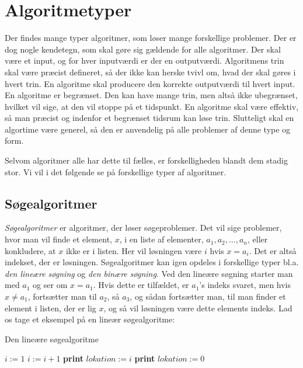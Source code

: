 \section{Algoritmetyper}
Der findes mange typer algoritmer, som løser mange forskellige problemer. Der er dog nogle kendetegn, som skal gøre sig gældende for alle algoritmer. Der skal være et input, og for hver inputværdi er der en outputværdi. Algoritmens trin skal være præcist defineret, så der ikke kan herske tvivl om, hvad der skal gøres i hvert trin. En algoritme skal producere den korrekte outputværdi til hvert input. En algoritme er begrænset. Den kan have mange trin, men altså ikke ubegrænset, hvilket vil sige, at den vil stoppe på et tidspunkt. En algoritme skal være effektiv, så man præcist og indenfor et begrænset tidsrum kan løse trin. Slutteligt skal en algortime være generel, så den er anvendelig på alle problemer af denne type og form.

Selvom algoritmer alle har dette til fælles, er forskelligheden blandt dem stadig stor. Vi vil i det følgende se på forskellige typer af algoritmer.
\subsection{Søgealgoritmer}
\emph{Søgealgoritmer} er algoritmer, der løser søgeproblemer. Det vil sige problemer, hvor man vil finde et element, $x$, i en liste af elementer, $a_{1}, a_{2}, \dotsc, a_{n}$, eller konkludere, at $x$ ikke er i listen. Her vil løsningen være $i$ hvis $x=a_{i}$. Det er altså indekset, der er løsningen. Søgealgoritmer kan igen opdeles i forskellige typer bl.a. \emph{den lineære søgning} og \emph{den binære søgning}. Ved den lineære søgning starter man med $a_1$ og ser om $x=a_{1}$. Hvis dette er tilfældet, er $a_{1}$'s indeks svaret, men hvis $x \neq a_{1}$, fortsætter man til $a_{2}$, så $a_{3}$, og sådan fortsætter man, til man finder et element i listen, der er lig $x$, og så vil løsningen være dette elements indeks. Lad os tage et eksempel på en lineær søgealgoritme:

\begin{algorithm}[H]
\caption{Den lineære søgealgoritme}
\begin{algorithmic}[1]

    \State $i:=1$
        \State $i:=i+1$
    \State \textbf{print} $lokation:=i$
    \Else
    \State \textbf{print} $lokation:=0$
    \EndIf
    \EndWhile  \label{roy's loop}
\EndProcedure

\end{algorithmic}
\end{algorithm}


